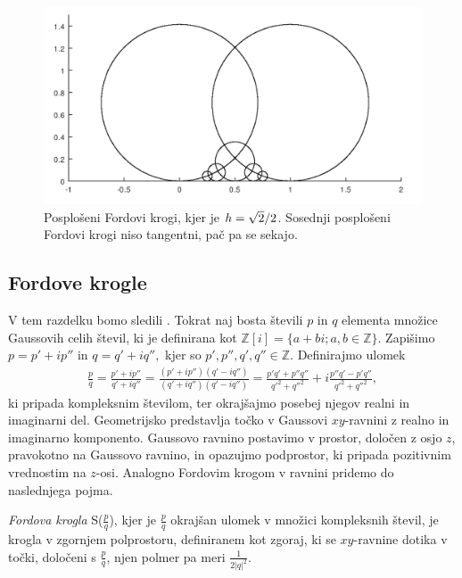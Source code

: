 \documentclass[mat1]{fmfdelo}
\newcommand{\Z}{\mathbb Z}
\begin{document}
\begin{figure}[h!]
\begin{center}
\includegraphics[scale=0.6]{posploseni_fordovi_krogi.png}
\caption{Posplošeni Fordovi krogi, kjer je $\protect{h=\sqrt{2}/2}$. Sosednji posplošeni Fordovi krogi niso tangentni, pač pa se sekajo.}
\label{Fig:PosplFord}
\end{center}
\end{figure}

\subsection{Fordove krogle}

V tem razdelku bomo sledili \cite[poglavje 8]{ford}.
Tokrat naj bosta števili $p$ in $q$ elementa množice Gaussovih celih števil, ki je definirana kot $\mathbb{Z}\left[{i}\right] = \{a+bi; a,b \in \Z \}.$ Zapišimo $p = p'+ip''$ in $q = q'+iq'',$ kjer so $p', p'', q', q'' \in \Z.$ Definirajmo ulomek
\begin{align} 
\frac{p}{q} = \frac{p'+ip''}{q'+iq''} = \frac{(p'+ip'')(q'-iq'')}{(q'+iq'')(q'-iq'')} = \frac{p'q'+p''q''}{q'^2+q''^2} + i \frac{p''q'-p'q''}{q'^2+q''^2},
\end{align}
ki pripada kompleksnim številom, ter okrajšajmo posebej njegov realni in imaginarni del. Geometrijsko predstavlja točko v Gaussovi $xy$-ravnini z realno in imaginarno komponento. Gaussovo ravnino postavimo v prostor, določen z osjo $z$, pravokotno na Gaussovo ravnino, in opazujmo podprostor, ki pripada pozitivnim vrednostim na $z$-osi. Analogno Fordovim krogom v ravnini pridemo do naslednjega pojma. 

\begin{definicija}
\emph{Fordova krogla} S($\frac{p}{q}$), kjer je $\frac{p}{q}$ okrajšan ulomek v množici kompleksnih števil, je krogla v zgornjem polprostoru, definiranem kot zgoraj, ki se $xy$-ravnine dotika v točki, določeni s $\frac{p}{q}$, njen polmer pa meri $\frac{1}{2|q|^2}.$
\end{definicija}
\end{document}
